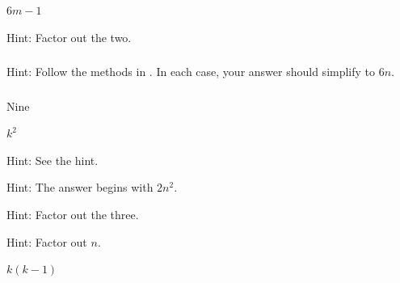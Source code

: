 \subsubsection*{ \answers}
\begin{apart}
    \item $6m-1$
    \item Hint: Factor out the two.
\end{apart}

\subsubsection*{ \answers}
Hint: Follow the methods in .  In each case, your answer should simplify to $6n$.

\subsubsection*{ \answers}
\begin{apart}
    \item Nine
    \item $k^2$
    \item Hint: See the hint.
    \item Hint: The answer begins with $2n^2$.
    \item Hint: Factor out the three.
    \item Hint: Factor out $n$.
    \item $k(k-1)$
\end{apart}

